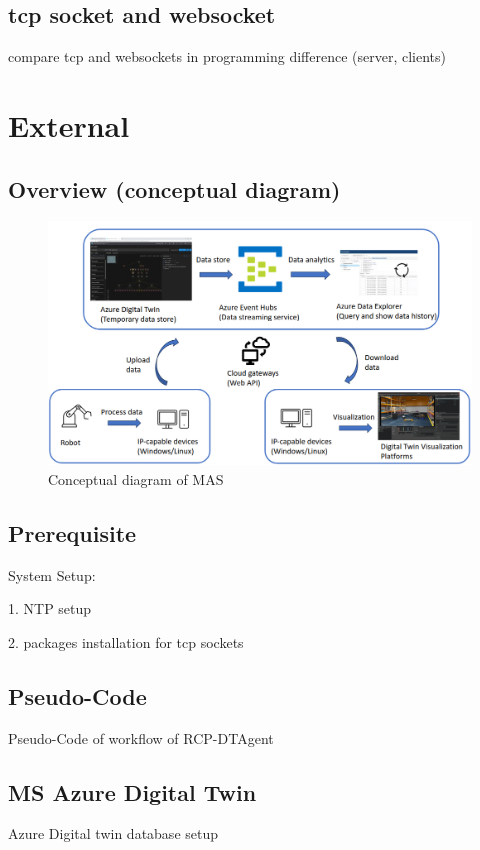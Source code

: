 \subsection{tcp socket and websocket}
compare tcp and websockets in programming difference (server, clients)


\section{External}
\subsection{Overview (conceptual diagram)}

\begin{figure}[htb]
\includegraphics[width=\textwidth]{figures/DT_Conceptual_Diagram.png}
\centering
\caption{Conceptual diagram of MAS\label{fig: DTConceptual}}
\end{figure}



\subsection{Prerequisite}
System Setup: 


1. NTP setup


2. packages installation for tcp sockets


\subsection{Pseudo-Code}
Pseudo-Code of workflow of RCP-DTAgent

\subsection{MS Azure Digital Twin}
Azure Digital twin database setup
